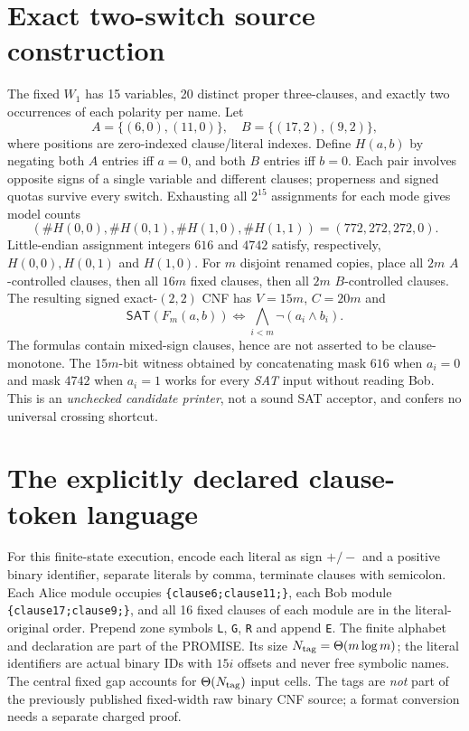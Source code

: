 \documentclass[11pt]{article}
\newcommand{\SAT}{\mathsf{SAT}}
\begin{document}
\section{Exact two-switch source construction}
The fixed $W_1$ has 15 variables, 20 distinct proper three-clauses, and
exactly two occurrences of each polarity per name. Let
\[
A=\{(6,0),(11,0)\},\quad B=\{(17,2),(9,2)\},
\]
where positions are zero-indexed clause/literal indexes. Define $H(a,b)$ by
negating both $A$ entries iff $a=0$, and both $B$ entries iff $b=0$.
Each pair involves opposite signs of a single variable and different clauses;
properness and signed quotas survive every switch. Exhausting all
$2^{15}$ assignments for each mode gives model counts
\[
(\#H(0,0),\#H(0,1),\#H(1,0),\#H(1,1))=(772,272,272,0).
\]
Little-endian assignment integers $616$ and $4742$ satisfy, respectively,
$H(0,0),H(0,1)$ and $H(1,0)$. For $m$ disjoint renamed copies, place all $2m$
$A$-controlled clauses, then all $16m$ fixed clauses, then all $2m$
$B$-controlled clauses. The resulting signed exact-$(2,2)$ CNF has
$V=15m$, $C=20m$ and
\[
\SAT(F_m(a,b))\iff\bigwedge_{i<m}\neg(a_i\land b_i).\tag{1}
\]
The formulas contain mixed-sign clauses, hence are not asserted to be
clause-monotone. The $15m$-bit witness obtained by concatenating mask $616$
when $a_i=0$ and mask $4742$ when $a_i=1$ works for every \emph{SAT}
input without reading Bob. This is an \emph{unchecked candidate printer},
not a sound SAT acceptor, and confers no universal crossing shortcut.

\section{The explicitly declared clause-token language}
For this finite-state execution, encode each literal as sign $+/-$ and a
positive binary identifier, separate literals by comma, terminate clauses
with semicolon. Each Alice module occupies
\texttt{\{clause6;clause11;\}}, each Bob module
\texttt{\{clause17;clause9;\}}, and all 16 fixed clauses of each module are
in the literal-original order. Prepend zone symbols \texttt{L}, \texttt{G},
\texttt{R} and append \texttt{E}. The finite alphabet and declaration are
part of the PROMISE. Its size $N_{\rm tag}=\Theta(m\log m)$; the literal
identifiers are actual binary IDs with $15i$ offsets and never free symbolic
names. The central fixed gap accounts for $\Theta(N_{\rm tag})$ input cells.
The tags are \emph{not} part of the previously published fixed-width raw
binary CNF source; a format conversion needs a separate charged proof.
\end{document}
